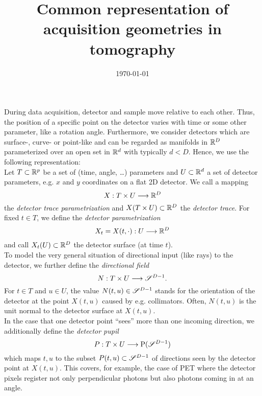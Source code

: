 \documentclass{amsart}
\title{Common representation of acquisition geometries in tomography}
\author{}
\date{\today}
\begin{document}
\maketitle

During data acquisition, detector and sample move relative to each other. Thus, the position of a specific point on the detector varies 
with time or some other parameter, like a rotation angle. Furthermore, we consider detectors which are surface-, curve- or point-like and 
can be regarded as manifolds in ${\mathbb{R}}^D$ parameterized over an open set in ${\mathbb{R}}^d$ with typically $d < D$. Hence, we use the following 
representation:\\
Let $T \subset {\ensuremath{\mathbb{R}}}^p$ be a set of (time, angle, \ldots) parameters and $U \subset {\ensuremath{\mathbb{R}}}^d$ a set of detector parameters, e.g. $x$ and $y$ 
coordinates on a flat 2D detector. We call a mapping
%
\begin{equation}
 X: T \times U \longrightarrow {\ensuremath{\mathbb{R}}}^D
\end{equation}
%
the \emph{detector trace parametrization} and $X(T \times U) \subset {\ensuremath{\mathbb{R}}}^D$ the \emph{detector trace}. For fixed $t \in T$, we define the 
\emph{detector parametrization}
%
\begin{equation}
 X_t = X(t, \cdot) : U \longrightarrow {\ensuremath{\mathbb{R}}}^D
\end{equation} 
%
and call $X_t(U) \subset {\ensuremath{\mathbb{R}}}^D$ the detector surface (at time $t$).\\[1ex]
%
%
To model the very general situation of directional input (like rays) to the detector, we further define the \emph{directional field}
%
\begin{equation}
 N: T \times U \longrightarrow \mathscr{S}^{D-1}.
\end{equation}
%
For $t \in T$ and $u \in U$, the value $N(t, u) \in \mathscr{S}^{D-1}$ stands for the orientation of the detector at the point $X(t,u)$ caused 
by e.g. collimators. Often, $N(t, u)$ is the unit normal to the detector surface at $X(t, u)$. \\[1ex]
%
%
In the case that one detector point ``sees'' more than one incoming direction, we additionally define the 
\emph{detector pupil}
%
\begin{equation}
 P: T \times U \longrightarrow \mathrm{P}(\mathscr{S}^{D-1})
\end{equation} 
%
which maps $t, u$ to the subset $P(t, u) \subset \mathscr{S}^{D-1}$ of directions seen by the detector point at $X(t, u)$. This covers, for 
example, the case of PET where the detector pixels register not only perpendicular photons but also photons coming in at an angle.\\[1ex]
\end{document}
